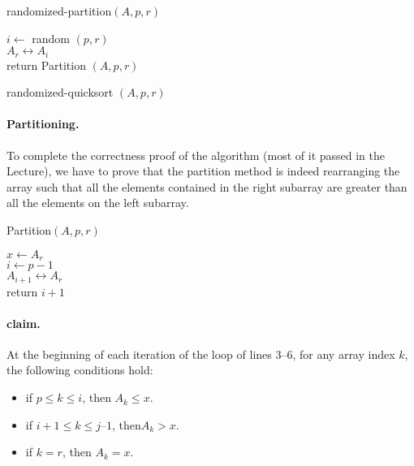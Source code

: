 \begin{algbox}{randomized-partition$(A, p, r)$}
  \begin{algorithm}[H]
      $i \leftarrow $ random $(p, r)$ \\
      $A_{r} \leftrightarrow A_{i} $ \\
      return Partition $(A, p, r)$
    \end{algorithm}
\end{algbox}
 \begin{algbox}{randomized-quicksort $(A, p, r)$}
      \begin{algorithm}[H]
      \end{algorithm}
\end{algbox}


\paragraph{Partitioning.}
To complete the correctness proof of the algorithm (most of it passed in the Lecture), we have to prove that the partition method is indeed rearranging the array such that all the elements contained in the right subarray are greater than all the elements on the left subarray.  


\begin{algbox}{Partition$(A, p, r)$}
  \begin{algorithm}[H]
    $ x \leftarrow A_{r} $ \\
    $ i \leftarrow p - 1 $ \\
   $ A_{i+1} \leftrightarrow A_{r} $\\
   return $ i+1$
  \end{algorithm}
\end{algbox}

\paragraph{claim.} At the beginning of each iteration of the loop of lines 3–6, for any array index $k$, the following conditions hold:
\begin{itemize}
  \item  if $p \le k \le i$, then $A_{k} \le x$.
  \item  if $i + 1 \le k \le j – 1$, then$ A_{k} > x$.
  \item  if $k = r$, then $A_{k} = x$.
\end{itemize}
